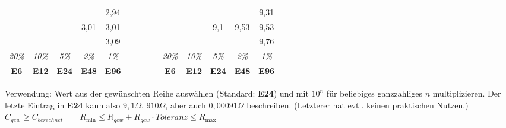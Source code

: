 \begin{table}[H]
\begin{tabular}{|c|c|c|c|c|c|c|c|c|c|c|}
                                    &                      &                      &                       & 2,94               &         &                                    &                       &                      &                       & 9,31               \\ \cline{4-5} \cline{9-11} 
                                    &                      &                      & \multirow{2}{*}{3,01} & 3,01               &         &                                    &                       & \multirow{2}{*}{9,1} & \multirow{2}{*}{9,53} & 9,53               \\ \cline{5-5} \cline{11-11} 
                                    &                      &                      &                       & 3,09               &         &                                    &                       &                      &                       & 9,76               \\ \cline{1-5} \cline{7-11} 
\multicolumn{1}{|c|}{\textit{20\%}} & \textit{10\%}        & \textit{5\%}         & \textit{2\%}          & \textit{1\%}       &         & \multicolumn{1}{c|}{\textit{20\%}} & \textit{10\%}         & \textit{5\%}         & \textit{2\%}          & \textit{1\%}       \\ \cline{1-5} \cline{7-11}
\cline{1-5} \cline{7-11}
{\textbf{E6}}                   & {\textbf{E12}}   & {\textbf{E24}}   & {\textbf{E48}}    & {\textbf{E96}} & $\quad\quad\quad$ & {\textbf{E6}}                  & {\textbf{E12}}    & {\textbf{E24}}   & {\textbf{E48}}    & {\textbf{E96}} \\ \cline{1-5} \cline{7-11}
\end{tabular}
\end{table}
\noindent
\small
Verwendung: Wert aus der gewünschten Reihe auswählen (Standard: \textbf{E24}) und mit $10^n$ für beliebiges ganzzahliges $n$ multiplizieren. Der letzte Eintrag in \textbf{E24} kann also $9,1\Omega$, $910\Omega$, aber auch $0,00091\Omega$ beschreiben. (Letzterer hat evtl. keinen praktischen Nutzen.)\\
\normalsize
$C_{gew}\geq C_{berechnet}\quad\quad R_{\min} \leq R_{gew}\pm R_{gew}\cdot Toleranz\leq R_{\max}$